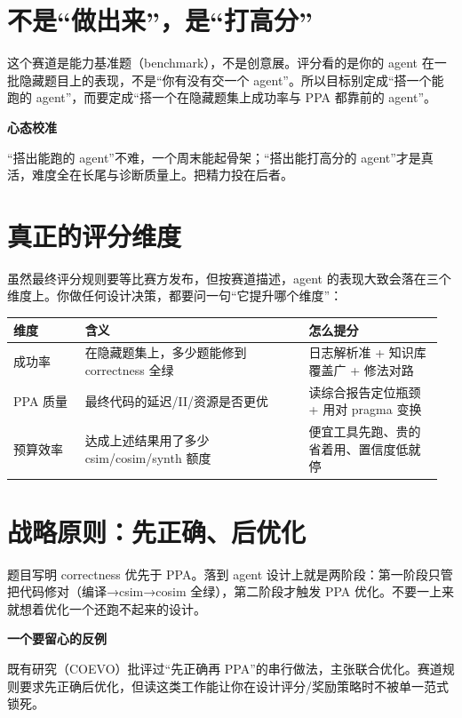\documentclass[12pt,a4paper]{ctexbook}
\begin{document}
\section{不是“做出来”，是“打高分”}

这个赛道是能力基准题（benchmark），不是创意展。评分看的是你的 agent 在一批隐藏题目上的表现，不是“你有没有交一个 agent”。所以目标别定成“搭一个能跑的 agent”，而要定成“搭一个在隐藏题集上成功率与 PPA 都靠前的 agent”。

\begin{warnbox}
\textbf{心态校准}\par
“搭出能跑的 agent”不难，一个周末能起骨架；“搭出能打高分的 agent”才是真活，难度全在长尾与诊断质量上。把精力投在后者。
\end{warnbox}

\section{真正的评分维度}

虽然最终评分规则要等比赛方发布，但按赛道描述，agent 的表现大致会落在三个维度上。你做任何设计决策，都要问一句“它提升哪个维度”：

\begin{longtable}{@{}p{0.16\linewidth}p{0.50\linewidth}p{0.30\linewidth}@{}}
\toprule
\textbf{维度} & \textbf{含义} & \textbf{怎么提分} \\
\midrule
\endhead
成功率 & 在隐藏题集上，多少题能修到 correctness 全绿 & 日志解析准 + 知识库覆盖广 + 修法对路 \\
PPA 质量 & 最终代码的延迟/II/资源是否更优 & 读综合报告定位瓶颈 + 用对 pragma 变换 \\
预算效率 & 达成上述结果用了多少 csim/cosim/synth 额度 & 便宜工具先跑、贵的省着用、置信度低就停 \\
\bottomrule
\end{longtable}

\section{战略原则：先正确、后优化}

题目写明 correctness 优先于 PPA。落到 agent 设计上就是两阶段：第一阶段只管把代码修对（编译→csim→cosim 全绿），第二阶段才触发 PPA 优化。不要一上来就想着优化一个还跑不起来的设计。

\begin{notebox}
\textbf{一个要留心的反例}\par
既有研究（COEVO）批评过“先正确再 PPA”的串行做法，主张联合优化。赛道规则要求先正确后优化，但读这类工作能让你在设计评分/奖励策略时不被单一范式锁死。
\end{notebox}
\end{document}
